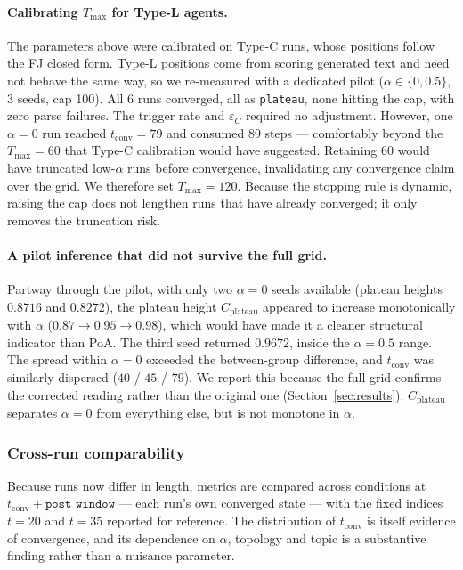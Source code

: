 \paragraph{Calibrating $T_{\max}$ for Type-L agents.}
The parameters above were calibrated on Type-C runs, whose positions follow the FJ
closed form. Type-L positions come from scoring generated text and need not behave the
same way, so we re-measured with a dedicated pilot ($\alpha \in \{0, 0.5\}$, 3 seeds,
cap 100). All 6 runs converged, all as \texttt{plateau}, none hitting the cap, with zero
parse failures. The trigger rate and $\varepsilon_C$ required no adjustment. However,
one $\alpha = 0$ run reached $t_{\mathrm{conv}} = 79$ and consumed 89 steps ---
comfortably beyond the $T_{\max} = 60$ that Type-C calibration would have suggested.
Retaining 60 would have truncated low-$\alpha$ runs before convergence, invalidating any
convergence claim over the grid. We therefore set $T_{\max} = 120$. Because the stopping
rule is dynamic, raising the cap does not lengthen runs that have already converged; it
only removes the truncation risk.

\paragraph{A pilot inference that did not survive the full grid.}
Partway through the pilot, with only two $\alpha = 0$ seeds available (plateau heights
$0.8716$ and $0.8272$), the plateau height $C_{\mathrm{plateau}}$ appeared to increase
monotonically with $\alpha$ ($0.87 \to 0.95 \to 0.98$), which would have made it a
cleaner structural indicator than PoA. The third seed returned $0.9672$, inside the
$\alpha = 0.5$ range. The spread within $\alpha = 0$ exceeded the between-group
difference, and $t_{\mathrm{conv}}$ was similarly dispersed ($40$ / $45$ / $79$). We
report this because the full grid confirms the corrected reading rather than the
original one (Section~\ref{sec:results}): $C_{\mathrm{plateau}}$ separates $\alpha = 0$
from everything else, but is not monotone in $\alpha$.

\subsubsection{Cross-run comparability}
\label{sec:comparability}

Because runs now differ in length, metrics are compared across conditions at
$t_{\mathrm{conv}} + \texttt{post\_window}$ --- each run's own converged state --- with
the fixed indices $t = 20$ and $t = 35$ reported for reference. The distribution of
$t_{\mathrm{conv}}$ is itself evidence of convergence, and its dependence on $\alpha$,
topology and topic is a substantive finding rather than a nuisance parameter.

\endgroup
